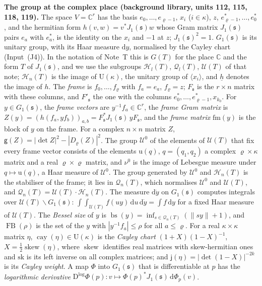 \documentclass[11pt,a4paper]{article}
\newcommand{\subhead}[1]{\par\addvspace{9pt plus 2pt}\Needspace{4\baselineskip}\noindent\textbf{#1}\enspace\ignorespaces}
\theoremstyle{plainx}
\theoremstyle{uprightx}
\newcommand{\CC}{\mathbb{C}}
\newcommand{\dd}{\mathrm{d}}
\newcommand{\GT}[1]{G(#1)}
\newcommand{\Hl}[2]{\mathcal{H}_{#1}(#2)}
\newcommand{\Ql}[2]{\mathcal{Q}_{#1}(#2)}
\newcommand{\UT}[1]{\mathcal{U}(#1)}
\newcommand{\Gone}[1]{G_1(#1)}
\newcommand{\Jone}[1]{J_1(#1)}
\newcommand{\Inp}[1]{\textup{(#1)}}
\newcommand{\emb}[1]{\underline{#1}}
\newcommand{\uq}[1]{\mathrm{u}(#1)}
\newcommand{\muz}{\nu^{0}}
\newcommand{\bs}[1]{\operatorname{bs}(#1)}
\newcommand{\frbox}[1]{\operatorname{FB}(#1)}
\newcommand{\cay}[1]{\operatorname{cay}(#1)}
\newcommand{\cayd}[1]{\mathsf{j}(#1)}
\newcommand{\gd}[1]{\mathsf{g}(#1)}
\begin{document}
\subhead{The group at the complex place (background library, units 112, 115, 118, 119).}\label{s:space}
The space $V=\CC^{r}$ has the basis $e_0,\dots,e_{\varrho-1}$, $x_i$ ($i\in\kappa$), $z$,
$e^*_{\varrho-1},\dots,e^*_0$, and the hermitian form $h(v,w)=v^{*}\Jone{\mathfrak{s}}w$ whose Gram matrix
$\Jone{\mathfrak{s}}$ pairs $e_a$ with $e^*_a$, is the identity on the $x_i$ and $-1$ at $z$;
$\Jone{\mathfrak{s}}^{2}=1$. $\Gone{\mathfrak{s}}$ is its unitary group, with its Haar measure $\dd y$, normalised by
the Cayley chart (Input~\Inp{J4}). In the
notation of Note~T this is $\GT{T}$ for the place $\CC$ and the form $T$ of $\Jone{\mathfrak{s}}$, and we use the
subgroups $\Hl{l}{T}$, $\Ql{l}{T}$, $\UT{T}$ of that note; $\Hl{n}{T}$ is the image of $\mathrm{U}(\kappa)$, the
unitary group of $\langle x_i\rangle$, and $\emb{h}$ denotes the image of $h$. The \emph{frame} is
$f_0,\dots,f_\varrho$ with $f_a=e_a$, $f_\varrho=z$; $F_{\mathfrak{s}}$ is the $r\times n$ matrix with these
columns, and $F'_{\mathfrak{s}}$ the one with the columns $e^*_0,\dots,e^*_{\varrho-1},x_{k_0}$. For
$y\in\Gone{\mathfrak{s}}$, the \emph{frame vectors} are $y^{-1}f_a\in\CC^{r}$, the \emph{frame Gram matrix} is
$Z(y)=(h(f_a,yf_b))_{a,b}=F_{\mathfrak{s}}^{*}\Jone{\mathfrak{s}}\,yF_{\mathfrak{s}}$, and the \emph{frame matrix}
$\mathrm{fm}(y)$ is the block of $y$ on the frame. For a complex $n\times n$ matrix $Z$,
$\gd{Z}=|\det Z|^{2}-|D_\varrho(Z)|^{2}$. The group $\mathcal{U}^0$ of the elements of $\UT{T}$ that fix every
frame vector consists of the elements $\uq{q}$, $q=(q_1,q_2)$ a complex $\varrho\times\kappa$ matrix and a real
$\varrho\times\varrho$ matrix, and $\muz$ is the image of Lebesgue measure under $q\mapsto\uq{q}$, a Haar measure
of $\mathcal{U}^0$. The group generated by $\mathcal{U}^0$ and $\Hl{n}{T}$ is the stabiliser of the frame; it lies
in $\Ql{n}{T}$, which normalises $\mathcal{U}^0$ and $\UT{T}$, and $\Ql{n}{T}=\UT{T}\cdot\Hl{n}{T}$. The measure
$\dd\dot y$ on $\Gone{\mathfrak{s}}$ computes integrals over $\UT{T}\backslash\Gone{\mathfrak{s}}$:
$\int\!\!\int_{\UT{T}}f(uy)\,\dd u\,\dd\dot y=\int f\,\dd y$ for a fixed Haar measure of $\UT{T}$. The \emph{Bessel
size} of $y$ is $\bs{y}=\inf_{s\in\Ql{n}{T}}(\|sy\|+1)$, and $\frbox{\rho}$ is the set of the $y$ with
$|y^{-1}f_a|\le\rho$ for all $a\le\varrho$. For a real $\kappa\times\kappa$ matrix $\eta$, $\cay{\eta}\in\mathrm{U}(\kappa)$
is the \emph{Cayley chart} $(1+X)(1-X)^{-1}$, $X=\tfrac12\operatorname{skew}(\eta)$, where $\operatorname{skew}$
identifies real matrices with skew-hermitian ones and $\mathrm{sk}$ is its left inverse on all complex matrices; and
$\cayd{\eta}=|\det(1-X)|^{-2k}$ is its \emph{Cayley weight}. A map $\Phi$ into $\Gone{\mathfrak{s}}$ that is
differentiable at $p$ has the \emph{logarithmic derivative}
$\mathrm{D}^{\log}\Phi(p)\colon v\mapsto\Phi(p)^{*}\Jone{\mathfrak{s}}\,\mathrm{d}\Phi_p(v)$.
\end{document}
